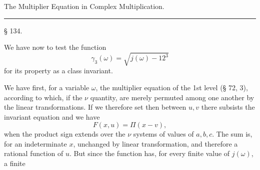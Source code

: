 
The Multiplier Equation in Complex
Multiplication.

\begin{center}\rule{3cm}{0.4pt}\end{center}

§ 134. 

We have now to test the function
\[
\gamma_3(\omega) = \sqrt{j(\omega) - 12^3}
\]
for its property as a class invariant.

We have first, for a variable $\omega$, the multiplier equation
 of the 1st level (§ 72, 3), according to which, if
the $\nu$ quantity, %
are merely permuted among one another by the linear
transformations. If we therefore set
then between $u, v$ there subsists the invariant equation
and we have
\[
F(x,u) = \Pi(x-v),
\]
when the product sign extends over the $\nu$ systems of values of
$a, b, c$. The sum
is, for an indeterminate $x$, unchanged by linear transformation,
 and therefore a rational function of $u$. But since the function
 has, for every finite value of $j(\omega)$, a finite
